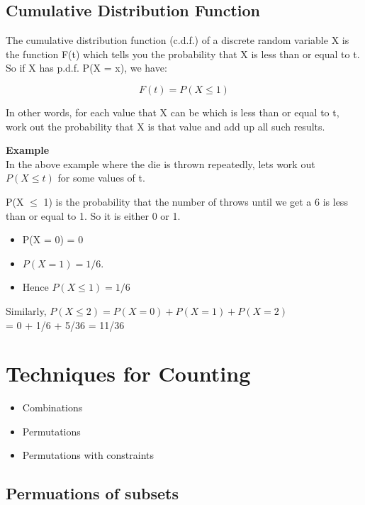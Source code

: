 \subsection{Cumulative Distribution Function}

The cumulative distribution function (c.d.f.) of a discrete random variable X is the function F(t) which tells you the probability that X is less than or equal to t. So if X has p.d.f. P(X = x), we have:

\[F(t) = P(X \leq 1)\] %

In other words, for each value that X can be which is less than or equal to t, work out the probability that X is that value and add up all such results.

\textbf{Example}\\

In the above example where the die is thrown repeatedly, lets work out $P(X \leq t)$ for some values of t.

P(X $\leq$ 1) is the probability that the number of throws until we get a 6 is less than or equal to 1. So it is either 0 or 1. 

\begin{itemize}
\item P(X = 0) = 0 
\item $P(X = 1) = 1/6$.
\item  Hence $P(X \leq 1) = 1/6$
\end{itemize}

Similarly, $P(X \leq 2) = P(X = 0) + P(X = 1) + P(X = 2)$\\ = 0 + 1/6 + 5/36 = 11/36

\newpage
\section{Techniques for Counting}

\begin{itemize}
\item Combinations
\item Permutations
\item Permutations with constraints
\end{itemize}



\subsection{Permuations of subsets}

